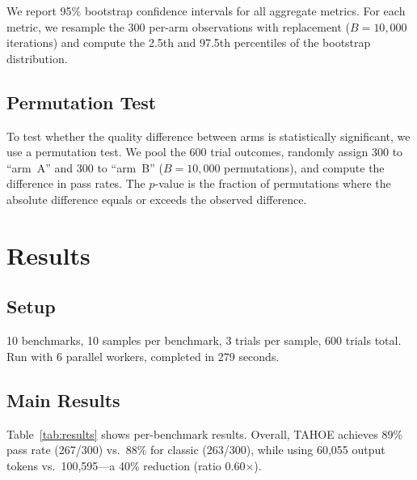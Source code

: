 \documentclass[11pt,a4paper]{article}
\begin{document}
We report 95\% bootstrap confidence intervals for all aggregate metrics.
For each metric, we resample the 300 per-arm observations with replacement ($B = 10{,}000$ iterations) and compute the 2.5th and 97.5th percentiles of the bootstrap distribution.

\subsection{Permutation Test}
\label{subsec:permutation}

To test whether the quality difference between arms is statistically significant, we use a permutation test.
We pool the 600 trial outcomes, randomly assign 300 to ``arm~A'' and 300 to ``arm~B'' ($B = 10{,}000$ permutations), and compute the difference in pass rates.
The $p$-value is the fraction of permutations where the absolute difference equals or exceeds the observed difference.

\section{Results}
\label{sec:results}

\subsection{Setup}

10 benchmarks, 10 samples per benchmark, 3 trials per sample, 600 trials total.
Run with 6 parallel workers, completed in 279 seconds.

\subsection{Main Results}

Table~\ref{tab:results} shows per-benchmark results.
Overall, TAHOE achieves 89\% pass rate (267/300) vs.\ 88\% for classic (263/300), while using 60{,}055 output tokens vs.\ 100{,}595---a 40\% reduction (ratio 0.60$\times$).
\end{document}
